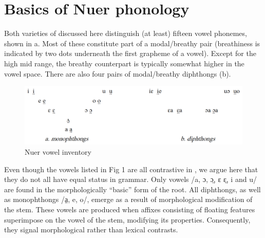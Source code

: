 \documentclass[output=paper,newtxmath,modfonts,nonflat]{langsci/langscibook}
\begin{document}
\section{Basics of Nuer phonology} %

Both varieties of  discussed here distinguish (at least) fifteen vowel phonemes, shown in a. Most of these constitute part of a modal/breathy pair (breathiness is indicated by two dots underneath the first grapheme of a vowel). Except for the high mid range, the breathy counterpart is typically somewhat higher in the vowel space. There are also four pairs of modal/breathy diphthongs (b). 



\begin{figure}
	\includegraphics[width=\textwidth]{figures/fig-monich-1.png}
	\caption{Nuer vowel inventory}
	\label{fig:monich:1}
\end{figure}

\pagebreak

Even though the vowels listed in Fig 1 are all contrastive in , we argue here that they do not all have equal status in  grammar. Only vowels /a, ɔ, ɔ̤, ɛ ɛ̤, i and u/ are found in the morphologically “basic” form of the root. All diphthongs, as well as monophthongs /a̤, e, o/, emerge as a result of morphological modification of the stem. These vowels are produced when affixes consisting of floating features superimpose on the vowel of the stem, modifying its properties. Consequently, they signal morphological rather than lexical contrasts.
\end{document}
